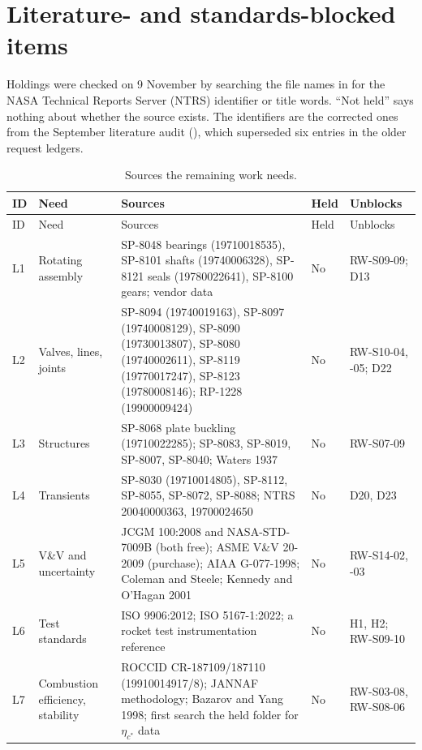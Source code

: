\section{Literature- and standards-blocked items}\label{sec:rw-literature}

Holdings were checked on 9 November by searching the file names in  for the NASA Technical Reports Server (NTRS) identifier or title words. ``Not held'' says nothing about whether the source exists. The identifiers are the corrected ones from the September literature audit (), which superseded six entries in the older request ledgers.

{\rwsmall
\begin{longtable}{@{}P{0.65cm}P{2.6cm}P{8.0cm}P{1.35cm}P{3.0cm}@{}}
\caption{Sources the remaining work needs.}\label{tab:rw-lit}\\
\toprule
ID & Need & Sources & Held & Unblocks \\
\midrule
\endfirsthead
\toprule
ID & Need & Sources & Held & Unblocks \\
\midrule
\endhead
L1 & Rotating assembly & SP-8048 bearings (19710018535), SP-8101 shafts (19740006328), SP-8121 seals (19780022641), SP-8100 gears; vendor data & No & RW-S09-09; D13 \\
L2 & Valves, lines, joints & SP-8094 (19740019163), SP-8097 (19740008129), SP-8090 (19730013807), SP-8080 (19740002611), SP-8119 (19770017247), SP-8123 (19780008146); RP-1228 (19900009424) & No & RW-S10-04, -05; D22 \\
L3 & Structures & SP-8068 plate buckling (19710022285); SP-8083, SP-8019, SP-8007, SP-8040; Waters 1937 & No & RW-S07-09 \\
L4 & Transients & SP-8030 (19710014805), SP-8112, SP-8055, SP-8072, SP-8088; NTRS 20040000363, 19700024650 & No & D20, D23 \\
L5 & V\&V and uncertainty & JCGM 100:2008 and NASA-STD-7009B (both free); ASME V\&V 20-2009 (purchase); AIAA G-077-1998; Coleman and Steele; Kennedy and O'Hagan 2001 & No & RW-S14-02, -03 \\
L6 & Test standards & ISO 9906:2012; ISO 5167-1:2022; a rocket test instrumentation reference & No & H1, H2; RW-S09-10 \\
L7 & Combustion efficiency, stability & ROCCID CR-187109/187110 (19910014917/8); JANNAF methodology; Bazarov and Yang 1998; first search the held  folder for $\eta_{c^*}$ data & No & RW-S03-08, RW-S08-06 \\

\end{longtable}}
